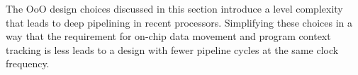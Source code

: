 
The OoO design choices discussed in this section introduce a level complexity
that leads to deep pipelining in recent processors. Simplifying these choices in
a way that the requirement for on-chip data movement and program context
tracking is less leads to a design with fewer pipeline cycles at the same clock
frequency.


